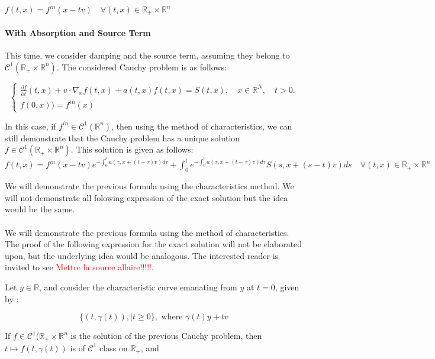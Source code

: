 \documentclass[a4paper, 11pt]{article}
\begin{document}
$\boxed{f(t,x)=f^{in}(x-tv) \quad \forall (t,x) \in \mathbb{R}_+ \times \mathbb{R}^n }$




\paragraph{With Absorption and Source Term}



This time, we consider damping and the source term, assuming they belong to $\mathcal{C}^1(\mathbb{R}_+ \times \mathbb{R}^n)$. The considered Cauchy problem is as follows:


\[
\begin{cases}
\frac{\partial f}{\partial t}(t,x)+v \cdot \nabla_x f(t,x) + a(t,x)f(t,x) = S(t,x), \quad x \in \mathbb{R}^N, \quad t>0.\\
f(0,x)) = f^{in}(x)
\end{cases}
\]

In this case, if $f^{in} \in \mathcal{C}^1(\mathbb{R}^n)$, then using the method of characteristics, we can still demonstrate that the Cauchy problem has a unique solution $f \in \mathcal{C}^1(\mathbb{R}_+ \times \mathbb{R}^n)$. This solution is given as follows:\\
$\boxed{f(t,x)=f^{in}(x-tv) e^{-\int_0 ^t a(\tau,x+(t-\tau)v)d\tau} + \int_0 ^t  e^{-\int_0 ^t a(\tau,x+(t-\tau)v)d\tau} S(s,x+(s-t)v)ds \quad \forall (t,x) \in \mathbb{R}_+ \times \mathbb{R}^n }$

We will demonstrate the previous formula using the characteristics method. We will not demonstrate all folowing expression of the exact solution but the idea would be the same.

\paragraph{}

We will demonstrate the previous formula using the method of characteristics. The proof of the following expression for the exact solution will not be elaborated upon, but the underlying idea would be analogous. The interested reader is invited to see \textcolor{red}{Mettre la source allaire!!!!!}.

Let $y \in \mathbb{R}$, and consider the characteristic curve emanating from $y$ at $t=0$, given by :

\[ \{(t,\gamma(t)), | t\geq 0\} , \text{ where } \gamma (t) 	y+tv\]

If $f \in \mathcal{C}^1(\mathbb{R}_+ \times \mathbb{R}^n$ is the solution of the previous Cauchy problem, then $t \mapsto f(t,\gamma(t))$ is of $\mathcal{C}^1$ class on $\mathbb{R}_+$, and 
\end{document}
